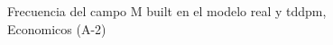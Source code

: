 \begin{figure}[H]
    \centering
    
    \caption{Frecuencia del campo M built en el modelo real y tddpm, Economicos (A-2)}
    \label{frecuency-M Built-tddpm_mlp}
\end{figure}